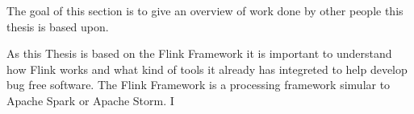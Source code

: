 The goal of this section is to give an overview of work done by other people this thesis is based upon.

As this Thesis is based on the Flink Framework it is important to understand how Flink works and what kind of tools it already has integreted to help develop bug free software. The Flink Framework is a processing framework simular to Apache Spark or Apache Storm. I
